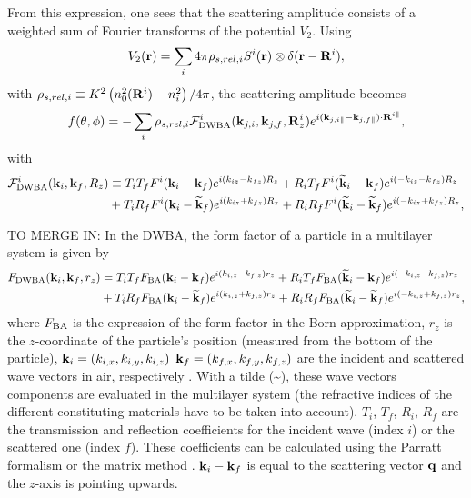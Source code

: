 From this expression, one sees that the scattering amplitude consists of a weighted sum of Fourier transforms of the potential $V_2$. Using
\begin{equation*}
  V_2(\mathbf{r}) = \sum_i 4\pi \rho_{s,rel,i} S^i(\mathbf{r}) \otimes \delta(\mathbf{r} - \mathbf{R}^i),
\end{equation*}
with $\rho_{s,rel,i}\equiv  K^2\left( n_0^2(\mathbf{R}^i) - n_i^2 \right)/4\pi$, the scattering amplitude becomes
\begin{equation*}
  f(\theta, \phi) = -\sum_i  \rho_{s,rel,i} \mathcal{F}^i_{\text{DWBA}}(\mathbf{k}_{j,i},\mathbf{k}_{j,f},\mathbf{R}^i_z)e^{i(\mathbf{k}_{j,i\parallel}-\mathbf{k}_{j,f\parallel})\cdot \mathbf{R}^{i\parallel} },
\end{equation*}
with
\begin{align*}
  \mathcal{F}^i_\text{DWBA}(\mathbf{k}_i,\mathbf{k}_f,R_z) & \equiv T_iT_fF^i(\mathbf{k}_i-\mathbf{k}_f)e^{i(k_{iz}-k_{fz})R_z} + R_iT_fF^i(\mathbf{\widetilde{k}}_i-\mathbf{k}_f)e^{i(-k_{iz}-k_{fz})R_z} \\
  & + T_iR_fF^i(\mathbf{k}_i-\mathbf{\widetilde{k}}_f)e^{i(k_{iz}+k_{fz})R_z} + R_iR_fF^i(\mathbf{\widetilde{k}}_i-\mathbf{\widetilde{k}}_f)e^{i(-k_{iz}+k_{fz})R_z},
\end{align*}

TO MERGE IN:
In the DWBA, the form factor of a particle in a multilayer system is given by
\begin{align}
F_{\rm{DWBA}} (\mathbf{k}_i,\mathbf{k}_f, r_z) & = T_i T_f F_{\rm{BA}} (\mathbf{k}_i-\mathbf{k}_f) e^{i (k_{i,z}-k_{f,z}) r_z} + R_i T_f F_{\rm{BA}}(\mathbf{\widetilde{k}}_i-\mathbf{k}_f) e^{i(-k_{i,z}-k_{f,z})r_z}
 \nonumber \\
  &+ T_i R_f F_{\rm{BA}}(\mathbf{k}_i-\mathbf{\widetilde{k}}_f)e^{i(k_{i,z}+k_{f,z})r_z} + R_iR_fF_{\rm{BA}} (\mathbf{\widetilde{k}}_i-\mathbf{\widetilde{k}}_f)e^{i(-k_{i,z}+k_{f,z})r_z}, \label{Edwbageneral}
\end{align}
where $F_{\rm{BA}}$ is the expression of the form factor in the Born approximation, $r_z$ is the $z$-coordinate of the particle's position (measured from the bottom of the particle), $\mathbf{k}_i=(k_{i,x}, k_{i,y}, k_{i,z})$ $\mathbf{k}_f=(k_{f,x}, k_{f,y}, k_{f,z})$ are the incident and scattered wave vectors in air, respectively \cite{RaSS95}.
With a tilde (\~{}), these wave vectors components are evaluated in the multilayer system (the refractive indices of the different constituting materials have to be taken into account). 
$T_i$, $T_f$, $R_i$, $R_f$ are the transmission and reflection coefficients for the incident wave (index $i$) or the scattered one (index $f$). These coefficients can be calculated using the Parratt formalism \cite{Par54} or the matrix method \cite{BoWo99}. $\mathbf{k}_i-\mathbf{k}_f$ is equal to the scattering vector $\mathbf{q}$ and the $z$-axis is pointing upwards.\\

